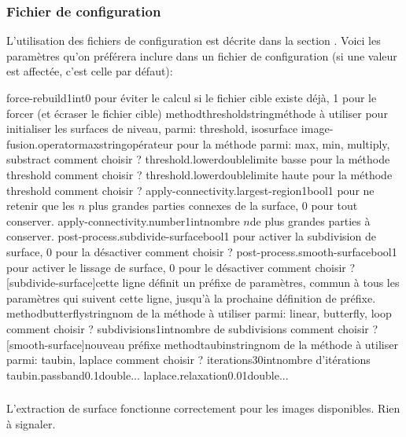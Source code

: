 	\subsubsection{Fichier de configuration}
	
L'utilisation des fichiers de configuration est décrite dans la section .
Voici les paramètres qu'on préférera inclure dans un fichier de configuration (si une valeur est affectée, c'est celle par défaut):

\configfile
{force-rebuild}{1}{int}{0 pour éviter le calcul si le fichier cible existe déjà, 1 pour le forcer (et écraser le fichier cible)}
{method}{threshold}{string}{méthode à utiliser pour initialiser les surfaces de niveau, parmi: threshold, isosurface}
{image-fusion.operator}{max}{string}{opérateur pour la méthode parmi: max, min, multiply, substract \tbv comment choisir ?}
{threshold.lower}{}{double}{limite basse pour la méthode threshold \tbv comment choisir ?}
{threshold.lower}{}{double}{limite haute pour la méthode threshold \tbv comment choisir ?}
{apply-connectivity.largest-region}{1}{bool}{1 pour ne retenir que les $n$ plus grandes parties connexes de la surface, 0 pour tout conserver.}
{apply-connectivity.number}{1}{int}{nombre $n$de plus grandes parties à conserver.}
{post-process.subdivide-surface}{}{bool}{1 pour activer la subdivision de surface, 0 pour la désactiver \tbv comment choisir ?}
{post-process.smooth-surface}{}{bool}{1 pour activer le lissage de surface, 0 pour le désactiver \tbv comment choisir ?}
{[subdivide-surface]}{cette ligne définit un préfixe de paramètres, commun à tous les paramètres qui suivent cette ligne, jusqu'à la prochaine définition de préfixe.}{}{}
{method}{butterfly}{string}{nom de la méthode à utiliser parmi: linear, butterfly, loop \tbv comment choisir ?}
{subdivisions}{1}{int}{nombre de subdivisions \tbv comment choisir ?}
{[smooth-surface]}{nouveau préfixe}{}{}
{method}{taubin}{string}{nom de la méthode à utiliser parmi: taubin, laplace \tbv comment choisir ?}
{iterations}{30}{int}{nombre d'itérations}
{taubin.passband}{0.1}{double}{...\tbv}
{laplace.relaxation}{0.01}{double}{...\tbv}
\stopfile

	\subsubsection{\etatg}

L'extraction de surface fonctionne correctement pour les images disponibles. Rien à signaler.


